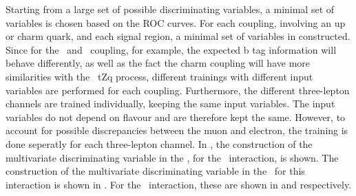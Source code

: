 Starting from a large set of possible discriminating variables, a minimal set of variables is chosen based on the ROC curves. For each coupling, involving an up or charm quark, and each signal region, a minimal set of variables in constructed. Since for the \Zut\ and \Zct\ coupling, for example, the expected b tag information will behave differently, as well as the fact the charm coupling will have more similarities with the \SM\ tZq process, different trainings with different input variables are performed for each coupling. Furthermore, the different three-lepton channels are trained individually, keeping the same input variables. The input variables do not depend on flavour and are therefore kept the same. However, to account for possible discrepancies between the muon and electron, the training is done seperatly for each three-lepton channel. In , the construction of the multivariate discriminating variable in the \STSR, for the \Zut\ interaction, is shown. The construction of the multivariate discriminating variable in the \TTSR\ for this interaction is shown in . For the \Zct\ interaction, these are shown in  and  respectively. 

